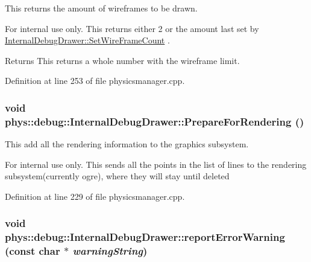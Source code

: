 This returns the amount of wireframes to be drawn. 

\begin{DoxyInternal}{For internal use only.}
This returns either 2 or the amount last set by \hyperlink{classphys_1_1debug_1_1InternalDebugDrawer_a76922fda7bb3b59d301e50d67e4f3c72}{InternalDebugDrawer::SetWireFrameCount} . \begin{DoxyReturn}{Returns}
This returns a whole number with the wireframe limit. 
\end{DoxyReturn}
\end{DoxyInternal}


Definition at line 253 of file physicsmanager.cpp.

\hypertarget{classphys_1_1debug_1_1InternalDebugDrawer_a1002293d223ca20e5bccc3c3412ce262}{
\subsubsection[{PrepareForRendering}]{\setlength{\rightskip}{0pt plus 5cm}void phys::debug::InternalDebugDrawer::PrepareForRendering ()}}
\label{db/d27/classphys_1_1debug_1_1InternalDebugDrawer_a1002293d223ca20e5bccc3c3412ce262}


This add all the rendering information to the graphics subsystem. 

\begin{DoxyInternal}{For internal use only.}
This sends all the points in the list of lines to the rendering subsystem(currently ogre), where they will stay until deleted \end{DoxyInternal}


Definition at line 229 of file physicsmanager.cpp.

\hypertarget{classphys_1_1debug_1_1InternalDebugDrawer_a4e3b4cbc861f76696b4d32f0cf068ea6}{
\subsubsection[{reportErrorWarning}]{\setlength{\rightskip}{0pt plus 5cm}void phys::debug::InternalDebugDrawer::reportErrorWarning (const char $\ast$ {\em warningString})}}
\label{db/d27/classphys_1_1debug_1_1InternalDebugDrawer_a4e3b4cbc861f76696b4d32f0cf068ea6}


